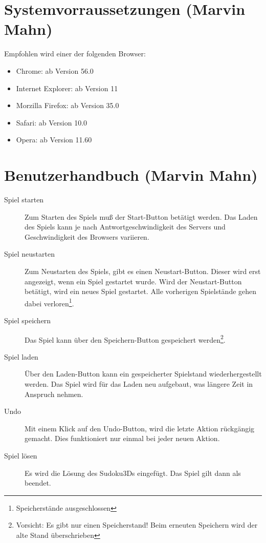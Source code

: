 \documentclass[a4paper,12pt]{scrreprt}
\begin{document}
	\section{Systemvorraussetzungen (Marvin Mahn)}
	Empfohlen wird einer der folgenden Browser:
	\begin{itemize}
		\item Chrome: ab Version 56.0
		\item Internet Explorer: ab Version 11
		\item Morzilla Firefox: ab Version 35.0
		\item Safari: ab Version 10.0
		\item Opera: ab Version 11.60
	\end{itemize}

	\section{Benutzerhandbuch (Marvin Mahn)}
	\begin{description}
		\item[Spiel starten] Zum Starten des Spiels mu{\ss} der Start-Button bet\"atigt werden. Das Laden
			des Spiels kann je nach Antwortgeschwindigkeit des Servers und Geschwindigkeit des Browsers
			variieren.
		\item[Spiel neustarten] Zum Neustarten des Spiels, gibt es einen Neustart-Button. Dieser wird
			erst angezeigt, wenn ein Spiel gestartet wurde. Wird der Neustart-Button bet\"atigt, wird ein
			neues Spiel gestartet. Alle vorherigen Spielst\"ande gehen dabei verloren\footnote{Speicherst\"ande
			ausgeschlossen}.
		\item[Spiel speichern] Das Spiel kann \"uber den Speichern-Button gespeichert werden\footnote{
				Vorsicht: Es gibt nur einen Speicherstand! Beim erneuten Speichern wird der alte Stand
				\"uberschrieben}.
		\item[Spiel laden] \"Uber den Laden-Button kann ein gespeicherter Spielstand wiederhergestellt
			werden. Das Spiel wird f\"ur das Laden neu aufgebaut, was l\"angere Zeit in Anspruch nehmen.
		\item[Undo] Mit einem Klick auf den Undo-Button, wird die letzte Aktion r\"uckg\"angig gemacht.
			Dies funktioniert nur einmal bei jeder neuen Aktion.
		\item[Spiel l\"osen] Es wird die L\"osung des Sudoku3Ds eingef\"ugt. Das Spiel gilt dann als beendet.
	\end{description}
\end{document}
